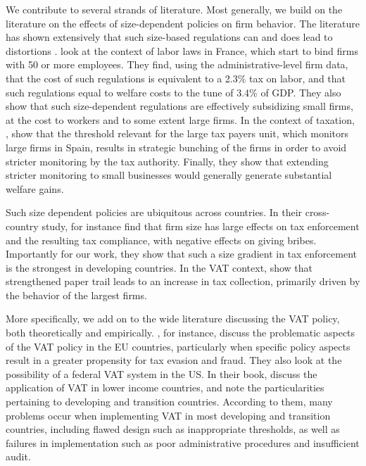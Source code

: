 We contribute to several strands of literature. Most generally, we build on the literature on the effects of size-dependent policies on firm behavior. The literature has shown extensively that such size-based regulations can and does lead to distortions \citep{gollin1995taxes,guner2008macroeconomic}. \citet{garicano2016firm} look at the context of labor laws in France, which start to bind firms with 50 or more employees. They find, using the administrative-level firm data, that the cost of such regulations is equivalent to a 2.3\% tax on labor, and that such regulations equal to welfare costs to the tune of 3.4\% of GDP. They also show that such size-dependent regulations are effectively subsidizing small firms, at the cost to workers and to some extent large firms. In the context of taxation, \citet{almunia2018under}, show that the threshold relevant for the large tax payers unit, which monitors large firms in Spain, results in strategic bunching of the firms in order to avoid stricter monitoring by the tax authority. Finally, they show that extending stricter monitoring to small businesses would generally generate substantial welfare gains.

Such size dependent policies are ubiquitous across countries. In their cross-country study, \citet{bachas2017size} for instance find that firm size has large effects on tax enforcement and the resulting tax compliance, with negative effects on giving bribes. Importantly for our work, they show that such a size gradient in tax enforcement is the strongest in developing countries. In the VAT context, \citet{mittal2017vat} show that strengthened paper trail leads to an increase in tax collection, primarily driven by the behavior of the largest firms. 

More specifically, we add on to the wide literature discussing the VAT policy, both theoretically and empirically. \citet{keen2006vat}, for instance, discuss the problematic aspects of the VAT policy in the EU countries, particularly when specific policy aspects result in a greater propensity for tax evasion and fraud. They also look at the possibility of a federal VAT system in the US. In their book, \citet{bird2007vat} discuss the application of VAT in lower income countries, and note the particularities pertaining to developing and transition countries. According to them, many problems occur when implementing VAT in most developing and transition countries, including flawed design such as inappropriate thresholds, as well as failures in implementation such as poor administrative procedures and insufficient audit.   

